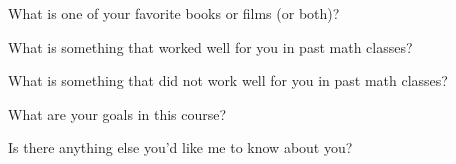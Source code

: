 %
%

\noindent{}What is one of your favorite books or films (or both)?

\vspace{0.5in}

\noindent{}What is something that worked well for you in past math classes?

\vspace{0.75in}

\noindent{}What is something that did not work well for you in past math classes?

\vspace{0.75in}

\noindent{}What are your goals in this course?

\vspace{0.75in}

\noindent{}Is there anything else you'd like me to know about you?